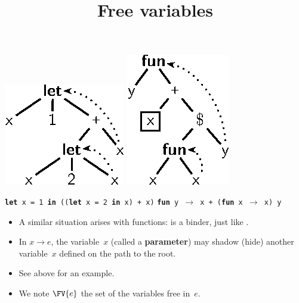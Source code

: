 \documentclass[wide]{slides}
\begin{document}
\begin{slide}
  \title{Free variables}

  \begin{center}
    \includegraphics[bb=5 658 169 721]{free_var1.eps}
    \includegraphics{free_var2.eps}
  \end{center}
  \centerline{\texttt{\textbf{let} x = 1 \textbf{in} ((\textbf{let} x =
      2 \textbf{in} x) + x)} \qquad
        \texttt{\textbf{fun} y \(\rightarrow\) x + (\textbf{fun}
      x \(\rightarrow\) x) y}}

  \begin{itemize}

    \item A similar situation arises with functions: \Xfun is a
      binder, just like \Xlet.

    \item In \Xfun $x \rightarrow e$, the variable~\(x\) (called a
      \textbf{parameter}) may shadow (hide) another variable~\(x\)
      defined on the path to the root.

    \item See above for an example.

    \item We note \(\FV{e}\) the set of the variables free in~\(e\).

  \end{itemize}
\end{slide}
\end{document}
